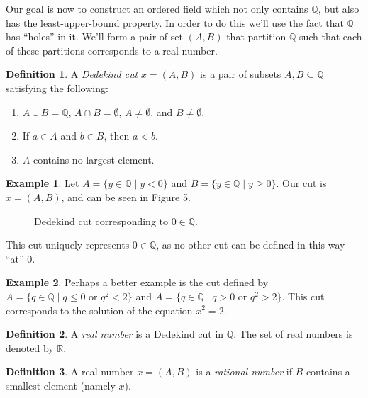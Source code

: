 \documentclass{article}
\newcommand{\R}{\mathbb{R}}
\newcommand{\Q}{\mathbb{Q}}
\theoremstyle{definition}
\newtheorem{definition}{Definition}[section]
\newtheorem{example}{Example}[section]
\begin{document}
Our goal is now to construct an ordered field which not only contains $ \Q $, but also has the least-upper-bound property. In order to do this we'll use the fact that $ \Q $ has ``holes'' in it. We'll form a pair of set $ (A,B) $ that partition $ \Q $ such that each of these partitions corresponds to a real number. 

\begin{definition}
	A \textit{\color{red}Dedekind cut} $ x=(A,B) $ is a pair of subsets $ A,B\subseteq \Q $ satisfying the following:
	\begin{enumerate}
		\item $ A\cup B=\Q $, $ A\cap B=\emptyset $, $ A\neq\emptyset $, and $ B\neq\emptyset $.
		\item If $ a\in A $ and $ b\in B $, then $ a<b $.
		\item $ A $ contains no largest element.
	\end{enumerate}
\end{definition} 
\begin{example}
	Let $ A=\{y\in \Q \mid y<0\} $ and $ B=\{y\in\Q\mid y\ge 0\} $. Our cut is $ x=(A,B) $, and can be seen in Figure 5.
		\begin{figure}[h]
		\centering
		\caption{Dedekind cut corresponding to $ 0\in\Q $.}
	\end{figure}
This cut uniquely represents $ 0\in\Q $, as no other cut can be defined in this way ``at'' $ 0 $. 
\end{example}
\begin{example}
	Perhaps a better example is the cut defined by $ A=\{q\in\Q\mid q\le 0\text{ or }q^2<2 \} $ and $ A=\{q\in\Q\mid q> 0\text{ or }q^2>2 \} $. This cut corresponds to the solution of the equation $ x^2=2 $.  
\end{example}
\begin{definition}
	A \textit{\color{red}real number} is a Dedekind cut in $ \Q $. The set of real numbers is denoted by $ \R $. 
\end{definition}
\begin{definition}
	A real number $ x=(A,B) $ is a \textit{\color{red}rational number} if $ B $ contains a smallest element (namely $ x $).
\end{definition}
\end{document}

